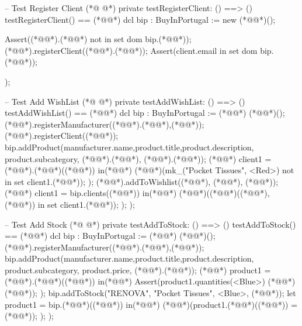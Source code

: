 \begin{vdmpp}[breaklines=true]
 -- Test Register Client
(*@
\label{testRegisterClient:182}
@*)
 private testRegisterClient: () ==> ()
 testRegisterClient() == (*@\vdmnotcovered{(}@*)
  dcl bip : BuyInPortugal := new (*@@*)();
  
  Assert((*@@*).(*@@*) not in set dom bip.(*@@*));
  (*@@*).registerClient((*@@*).(*@@*));
  Assert(client.email in set dom bip.(*@@*));
   
 );
 
 -- Test Add WishList
(*@
\label{testAddWishList:193}
@*)
 private testAddWishList: () ==> ()
 testAddWishList() == (*@\vdmnotcovered{(}@*)
  dcl bip : BuyInPortugal := (*@@*) (*@@*)();
  (*@@*).registerManufacturer((*@@*).(*@@*),(*@@*));
  (*@@*).registerClient((*@@*));
  bip.addProduct(manufacturer.name,product.title,product.description, product.subcategory, (*@@*).(*@@*), (*@@*).(*@@*));
  (*@@*) client1 = (*@@*).(*@@*)((*@@*))
  in(*@\vdmnotcovered{(}@*)
   (*@@*)(mk_("Pocket Tissues", <Red>) not in set client1.(*@@*));
  );
  (*@@*).addToWishlist((*@@*), (*@@*), (*@@*));
  (*@@*) client1 = bip.clients((*@@*))
  in(*@\vdmnotcovered{(}@*)
   (*@@*)((*@@*)((*@@*), (*@@*)) in set client1.(*@@*));
  );
 );
 
 -- Test Add Stock
(*@
\label{testAddToStock:211}
@*)
 private testAddToStock: () ==> ()
 testAddToStock() == (*@\vdmnotcovered{(}@*)
  dcl bip : BuyInPortugal := (*@@*) (*@@*)();
  (*@@*).registerManufacturer((*@@*).(*@@*),(*@@*));
  bip.addProduct(manufacturer.name,product.title,product.description, product.subcategory, product.price, (*@@*).(*@@*));
  (*@@*) product1 = (*@@*).(*@@*)((*@@*))
  in(*@\vdmnotcovered{(}@*)
   Assert(product1.quantities(<Blue>) (*@\vdmnotcovered{=}@*) (*@@*));
  );
  bip.addToStock("RENOVA", "Pocket Tissues", <Blue>, (*@@*));
  let product1 = bip.(*@@*)((*@@*))
  in(*@\vdmnotcovered{(}@*)
   (*@@*)(product1.(*@@*)((*@@*)) = (*@@*));
  );
 );
 

\end{vdmpp}
